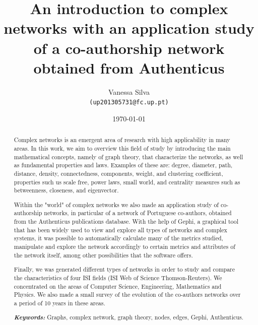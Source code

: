 \documentclass{article}
\providecommand{\keywords}[1]{\textbf{\textit{Keywords:}} #1}
\begin{document}
%
%

\title{An introduction to complex networks with an application study of a co-authorship network obtained from Authenticus}
%
\author{Vanessa Silva\\
	{\texttt{(up201305731@fc.up.pt)}}\\
}

\date{\today}

\maketitle



\begin{abstract}
Complex networks is an emergent area of research with high applicability in many areas. In this work, we aim to overview this field of study by introducing the main mathematical concepts, namely of graph theory, that characterize the networks, as well as fundamental properties and laws. Examples of these are: degree, diameter, path, distance, density, connectedness, components, weight, and clustering coefficient, properties such us scale free, power laws, small world, and centrality measures such as betweenness, closeness, and eigenvector.

Within the "world" of complex networks we also made an application study of co-authorship networks, in particular of a network of Portuguese co-authors, obtained from the Authenticus publications database. With the help of Gephi, a graphical tool that has been widely used to view and explore all types of networks and complex systems, it was possible to automatically calculate many of the metrics studied, manipulate and explore the network accordingly to certain metrics and attributes of the network itself, among other possibilities that the software offers.

Finally, we was generated different types of networks in order to study and compare the characteristics of four ISI fields (ISI Web of Science Thomson-Reuters). We concentrated on the areas of Computer Science, Engineering, Mathematics and Physics. We also made a small survey of the evolution of the co-authors networks over a period of 10 years in these areas.

\vspace{3mm}
\keywords{Graphs, complex network, graph theory, nodes, edges, Gephi, Authenticus.}
\vspace{5mm}
\end{abstract}
\end{document}

